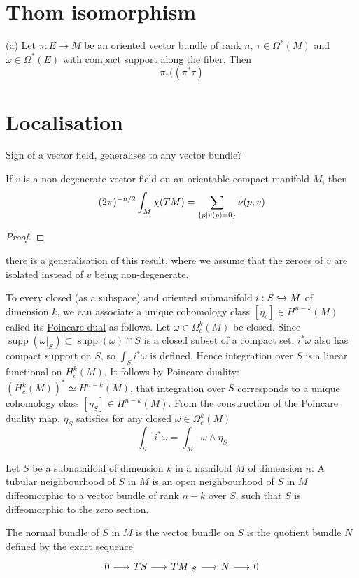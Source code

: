 \section{Thom isomorphism}
\begin{prop} %
	(a) Let $\pi : E \to M$ be an oriented vector bundle of rank  $n$,
	$\tau\in\Omega^*(M)$ and  $\omega\in \Omega^*(E)$ with compact support
	along the fiber. Then 
	 \[
	\pi_*((\pi^*\tau)  
	\] 
\end{prop}

\section{Localisation}
Sign of a vector field, generalises to any vector bundle? 
\begin{thm} %
	If $v$ is a non-degenerate vector field on an orientable compact manifold
	$M$, then 
	\[
		 (2\pi)^{-n /2} \int_M \chi(TM) = \sum_{\set{p|v(p)=0}} \nu(p,v)	
	\] 
\end{thm}
\begin{proof}
\end{proof}
there is a generalisation of this result, where we assume that the zeroes
of $v$ are isolated instead of $v$ being non-degenerate. 

To every closed (as a subspace) and oriented submanifold $i: S
\xhookrightarrow{} M$ of dimension  $k$, we can
associate a unique cohomology class  $[\eta_s]\in H^{n-k}(M)$ called its
\underline{Poincare dual} as follows. Let $\omega\in \Omega_c^k(M)$ be closed.
Since $\operatorname{supp}(\omega|_S) \subset \operatorname{supp}(\omega) \cap
S$ is a closed subset of a compact set, $i^*\omega$ also has compact support on
$S$, so  $\int_S i^*\omega$ is defined. Hence integration over  $S$ is a  
linear functional on $H^k_c(M)$. It follows by Poincare duality:
$(H_c^k(M))^*\simeq H^{n-k}(M)$, that integration over $S$ corresponds to a
unique cohomology class $[\eta_S]\in H^{n-k}(M)$. 
From the construction of the Poincare duality map, $\eta_S$ satisfies
for any closed $\omega\in \Omega^k_c(M)$
\[
\int_S i^*\omega = \int_M \omega \wedge \eta_S
\] 
\begin{defn}
	Let $S$ be a submanifold of dimension  $k$ in a manifold  $M$ of dimension
	$n$. A \underline{tubular neighbourhood} of  $S$ in  $M$ is an open
	neighbourhood of  $S$ in  $M$ diffeomorphic to a vector bundle of rank
	$n-k$ over  $S$, such that  $S$ is diffeomorphic to the zero section.

	The \underline{normal bundle} of $S$ in  $M$ is the vector bundle on  $S$
	is the quotient bundle $N$ defined by the exact sequence 
	\[
	\begin{tikzcd}[column sep = 1.6em]
		0 \arrow[r] & TS \arrow[r] & TM|_S \arrow[r] 
						& N \arrow[r] & 0
	\end{tikzcd}
	\] 	
\end{defn}

